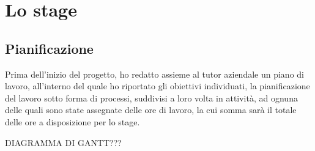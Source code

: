 
\chapter{Lo stage}
\label{cap:descrizione-stage}

\section{Pianificazione}
Prima dell'inizio del progetto, ho redatto assieme al tutor aziendale un piano di lavoro, all'interno del quale ho riportato gli obiettivi individuati, la pianificazione del lavoro sotto forma di processi, suddivisi a loro volta in attività, ad ognuna delle quali sono state assegnate delle ore di lavoro, la cui somma sarà il totale delle ore a disposizione per lo stage.

\bigskip


\medskip

DIAGRAMMA DI GANTT???

\medskip

